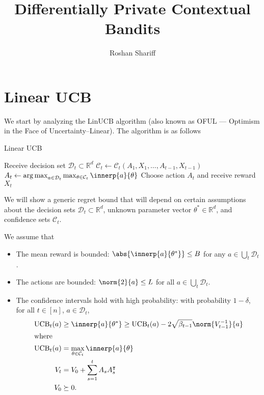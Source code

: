 \documentclass{article}
\title{Differentially Private Contextual Bandits}
\author{Roshan Shariff}
\newcommand{\inv}[1]{#1^{-1}}
\newcommand{\Real}{\mathds{R}}
\newcommand{\UCB}{\operatorname{UCB}}
\DeclareMathOperator*{\argmax}{arg\,max}
\DeclarePairedDelimiter{\abs}||
\newcommand{\transp}[1]{#1^\intercal}
\newcommand{\Dset}[1]{\mathcal{D}_{#1}}
\newcommand{\Cset}[1]{\mathcal{C}_{#1}}
\begin{document}
\maketitle

\section{Linear UCB}

We start by analyzing the LinUCB algorithm (also known as OFUL ---
Optimism in the Face of Uncertainty--Linear).  The algorithm is as follows

\begin{algorithm}
  \caption{Linear UCB}\label{alg:linucb}
  \begin{algorithmic}
    \State Receive decision set $\Dset{t} \subset \Real^d$
    \State $\Cset{t} \gets \Cset{t}(A_1,X_1,\dotsc,A_{t-1},X_{t-1})$
    \State $A_t \gets \argmax_{a\in\Dset{t}}
    \max_{\theta\in\Cset{t}} \innerp{a}{\theta}$
    \State Choose action $A_t$ and receive reward $X_t$
    \EndFor
  \end{algorithmic}
\end{algorithm}

We will show a generic regret bound that will depend on certain
assumptions about the decision sets $\Dset{t} \subset \Real^d$,
unknown parameter vector $\theta^*\in\Real^d$, and confidence sets
$\Cset{t}$.

\begin{assumption}\label{assumption:linucb}
  We assume that
  \begin{itemize}
  \item The mean reward is bounded: $\abs{\innerp{a}{\theta^*}} \le B$
    for any $a\in\bigcup_t\Dset{t}$.
  \item The actions are bounded: $\norm{2}{a} \le L$ for all
    $a\in\bigcup_t\Dset{t}$.
  \item The confidence intervals hold with high probability: with
    probability $1-\delta$, for all $t\in[n]$, $a\in\Dset{t}$,
    \begin{align*}
      \UCB_t(a) &\ge \innerp{a}{\theta^*} \ge \UCB_t(a) - 2\sqrt{\beta_{t-1}}\norm{\inv{V_{t-1}}}{a} \\
      \shortintertext{where}
      \UCB_t(a) &= \max_{\theta\in\Cset{t}} \innerp{a}{\theta} \\
      V_t &= V_0 + \sum_{s=1}^tA_s\transp{A_s} \\
      V_0 &\succeq 0.
    \end{align*}
  \end{itemize}
\end{assumption}
\end{document}
